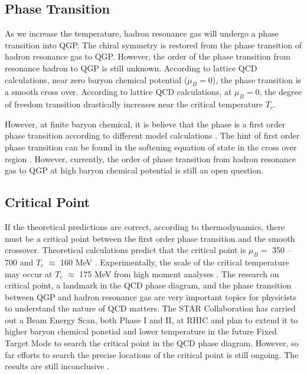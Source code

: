 \subsection{Phase Transition}

As we increase the temperature, hadron resonance gas will undergo a phase transition into QGP. The chiral symmetry is restored from the phase transition of hadron resonance gas to QGP. However, the order of the phase transition from resonance hadron to QGP is still unknown. According to lattice QCD calculations, near zero baryon chemical potential ($\mu_B = 0$), the phase transition is a smooth cross over. According to lattice QCD calculations, at $\mu_B = 0$, the degree of freedom transition drastically increases near the critical temperature $T_c$. 

 

 However, at finite baryon chemical, it is believe that the phase is a first order phase transition according to different model calculations \cite{QCDFirstOrder}. The hint of first order phase transition can be found in the softening equation of state in the cross over region \cite{EOSPhase}. However, currently, the order of phase transition from hadron resonance gas to QGP at high baryon chemical potential is still an open question. %

\subsection{Critical Point}

If the theoretical predictions are correct, according to thermodynamics, there must be a critical point between the first order phase transition and the smooth crossover. Theoretical calculations predict that the critical point is $\mu_B = $ 350 -- 700 and $T_{c}$ $\approx$ 160 MeV \cite{CriticalPointTH}. Experimentally, the scale of the critical temperature may occur at $T_{c}$ $\approx$ 175 MeV from high moment analyses \cite{CriticalPointEX}. The research on critical point, a landmark in the QCD phase diagram, and the phase transition between QGP and hadron resonance gas are very important topics for physicists to understand the nature of QCD matters. The STAR Collaboration has carried out a Beam Energy Scan, both Phase I and II, at RHIC and plan to extend it to higher baryon chemical ponetial and lower temperature in the future Fixed Target Mode to search the critical point in the QCD phase diagram. However, so far efforts to search the precise locations of the critical point is still ongoing. The results are still inconclusive \cite{STARBES}. 

